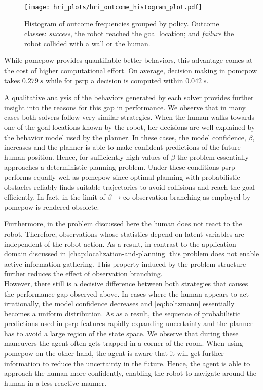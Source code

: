 \begin{figure}[H]
  \centering
  \texttt{[image: hri\_plots/hri\_outcome\_histogram\_plot.pdf]}
  \caption{Histogram of outcome frequencies grouped by policy. Outcome classes:
  \emph{success}, the robot reached the goal location; and \emph{failure} the
  robot collided with a wall or the human.}
  \label{fig:hri_outcome_histogram}
\end{figure}

While \ac{pomcpow} provides quantifiable better behaviors, this advantage comes
at the cost of higher computational effort. On average, decision making in
\ac{pomcpow} takes $\SI{0.279}{s}$ while for \ac{psrp} a decision is computed
within $\SI{0.042}{s}$.

A qualitative analysis of the behaviors generated by each solver provides
further insight into the reasons for this gap in performance. We observe that
in many cases both solvers follow very similar strategies. When the human walks
towards one of the goal locations known by the robot, her decisions are well
explained by the behavior model used by the planner. In these cases, the model
confidence, $\beta$, increases and the planner is able to make confident
predictions of the future human position. Hence, for sufficiently high values
of $\beta$ the problem essentially approaches a deterministic planning problem.
Under these conditions \ac{psrp} performs equally well as \ac{pomcpow} since
optimal planning with probabilistic obstacles reliably finds suitable
trajectories to avoid collisions and reach the goal efficiently. In fact, in
the limit of $\beta \to \infty$ observation branching as employed by
\ac{pomcpow} is rendered obsolete.

Furthermore, in the problem discussed here the human does not react to the
robot. Therefore, observations whose statistics depend on latent variables are
independent of the robot action. As a result, in contrast to the application
domain discussed in \cref{chap:localization-and-planning} this problem does not
enable active information gathering. This property induced by the problem
structure further reduces the effect of observation branching.\\ However, there
still is a decisive difference between both strategies that causes the
performance gap observed above. In cases where the human appears to act
irrationally, the model confidence decreases and \cref{eq:boltzmann} essentially
becomes a uniform distribution. As as a result, the sequence of probabilistic
predictions used in \ac{psrp} features rapidly expanding uncertainty and the
planner has to avoid a large region of the state space. We observe that during
these maneuvers the agent often gets trapped in a corner of the room. When
using \ac{pomcpow} on the other hand, the agent is aware that it will get
further information to reduce the uncertainty in the future. Hence, the agent
is able to approach the human more confidently, enabling the robot to navigate
around the human in a less reactive manner.

